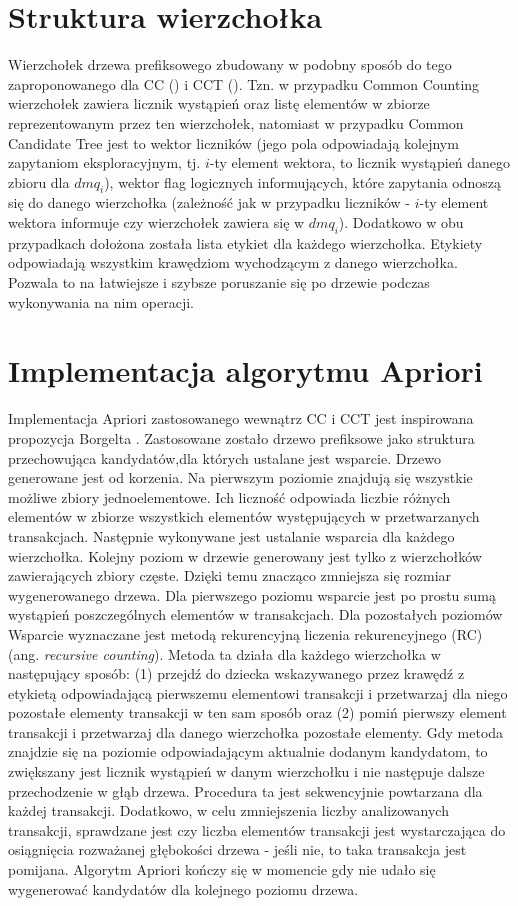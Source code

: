 \section{Struktura wierzchołka}
\label{c43}
Wierzchołek drzewa prefiksowego zbudowany w podobny sposób do tego zaproponowanego dla CC (\cite{WojciechowskiCC}) i CCT (\cite{WojciechowskiCCT}). Tzn. w przypadku Common Counting wierzchołek zawiera licznik wystąpień oraz listę elementów w zbiorze reprezentowanym przez ten wierzchołek, natomiast w przypadku Common Candidate Tree jest to wektor liczników (jego pola odpowiadają kolejnym zapytaniom eksploracyjnym, tj. \(i\)-ty element wektora, to licznik wystąpień danego zbioru dla \(dmq_i\)), wektor flag logicznych informujących, które zapytania odnoszą się do danego wierzchołka (zależność jak w przypadku liczników - \(i\)-ty element wektora informuje czy wierzchołek zawiera się w \(dmq_i\)). Dodatkowo w obu przypadkach dołożona została lista etykiet dla każdego wierzchołka. Etykiety odpowiadają wszystkim krawędziom wychodzącym z danego wierzchołka. Pozwala to na łatwiejsze i szybsze poruszanie się po drzewie podczas wykonywania na nim operacji. 

\section{Implementacja algorytmu Apriori}
\label{c44}

Implementacja Apriori zastosowanego wewnątrz CC i CCT jest inspirowana propozycja Borgelta \cite{Borgelt}. Zastosowane zostało drzewo prefiksowe jako struktura przechowująca kandydatów,dla których ustalane jest wsparcie. Drzewo generowane jest od korzenia. Na pierwszym poziomie znajdują się wszystkie możliwe zbiory jednoelementowe. Ich liczność odpowiada liczbie różnych elementów w zbiorze wszystkich elementów występujących w przetwarzanych transakcjach. Następnie wykonywane jest ustalanie wsparcia dla każdego wierzchołka. Kolejny poziom w drzewie generowany jest tylko z wierzchołków zawierających zbiory częste. Dzięki temu znacząco zmniejsza się rozmiar wygenerowanego drzewa. Dla pierwszego poziomu wsparcie jest po prostu sumą wystąpień poszczególnych elementów w transakcjach. Dla pozostałych poziomów Wsparcie wyznaczane jest metodą rekurencyjną liczenia rekurencyjnego (RC) (ang. \textit{recursive counting}). Metoda ta działa dla każdego wierzchołka w następujący sposób: (1) przejdź do dziecka wskazywanego przez krawędź z etykietą odpowiadającą pierwszemu elementowi transakcji i przetwarzaj dla niego pozostałe elementy transakcji w ten sam sposób oraz (2) pomiń pierwszy element transakcji i przetwarzaj dla danego wierzchołka pozostałe elementy. Gdy metoda znajdzie się na poziomie odpowiadającym aktualnie dodanym kandydatom, to zwiększany jest licznik wystąpień w danym wierzchołku i nie następuje dalsze przechodzenie w głąb drzewa. Procedura ta jest sekwencyjnie powtarzana dla każdej transakcji. Dodatkowo, w celu zmniejszenia liczby analizowanych transakcji, sprawdzane jest czy liczba elementów transakcji jest wystarczająca do osiągnięcia rozważanej głębokości drzewa - jeśli nie, to taka transakcja jest pomijana. Algorytm Apriori kończy się w momencie gdy nie udało się wygenerować kandydatów dla kolejnego poziomu drzewa.

